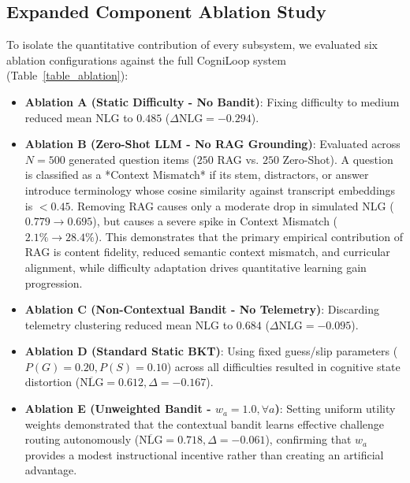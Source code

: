 \documentclass[journal]{IEEEtran}
\begin{document}
\subsection{Expanded Component Ablation Study}
To isolate the quantitative contribution of every subsystem, we evaluated six ablation configurations against the full CogniLoop system (Table~\ref{table_ablation}):
\begin{itemize}
    \item \textbf{Ablation A (Static Difficulty - No Bandit)}: Fixing difficulty to medium reduced mean NLG to $0.485$ ($\Delta \text{NLG} = -0.294$).
    \item \textbf{Ablation B (Zero-Shot LLM - No RAG Grounding)}: Evaluated across $N=500$ generated question items ($250$ RAG vs. $250$ Zero-Shot). A question is classified as a *Context Mismatch* if its stem, distractors, or answer introduce terminology whose cosine similarity against transcript embeddings is $< 0.45$. Removing RAG causes only a moderate drop in simulated NLG ($0.779 \rightarrow 0.695$), but causes a severe spike in Context Mismatch ($2.1\% \rightarrow 28.4\%$). This demonstrates that the primary empirical contribution of RAG is content fidelity, reduced semantic context mismatch, and curricular alignment, while difficulty adaptation drives quantitative learning gain progression.
    \item \textbf{Ablation C (Non-Contextual Bandit - No Telemetry)}: Discarding telemetry clustering reduced mean NLG to $0.684$ ($\Delta \text{NLG} = -0.095$).
    \item \textbf{Ablation D (Standard Static BKT)}: Using fixed guess/slip parameters ($P(G)=0.20, P(S)=0.10$) across all difficulties resulted in cognitive state distortion ($\overline{\text{NLG}} = 0.612, \Delta = -0.167$).
    \item \textbf{Ablation E (Unweighted Bandit - $w_a = 1.0, \forall a$)}: Setting uniform utility weights demonstrated that the contextual bandit learns effective challenge routing autonomously ($\overline{\text{NLG}} = 0.718, \Delta = -0.061$), confirming that $w_a$ provides a modest instructional incentive rather than creating an artificial advantage.
\end{itemize}
\end{document}
